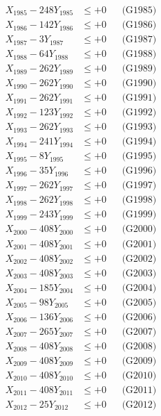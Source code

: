 \documentclass[a4paper,10pt]{article}
\begin{document}
{\begin{align}
X_{1985} - 248Y_{1985} &\leq +0 && \text{(G1985)} \\
X_{1986} - 142Y_{1986} &\leq +0 && \text{(G1986)} \\
X_{1987} - 3Y_{1987} &\leq +0 && \text{(G1987)} \\
X_{1988} - 64Y_{1988} &\leq +0 && \text{(G1988)} \\
X_{1989} - 262Y_{1989} &\leq +0 && \text{(G1989)} \\
X_{1990} - 262Y_{1990} &\leq +0 && \text{(G1990)} \\
\allowbreak
X_{1991} - 262Y_{1991} &\leq +0 && \text{(G1991)} \\
X_{1992} - 123Y_{1992} &\leq +0 && \text{(G1992)} \\
X_{1993} - 262Y_{1993} &\leq +0 && \text{(G1993)} \\
X_{1994} - 241Y_{1994} &\leq +0 && \text{(G1994)} \\
X_{1995} - 8Y_{1995} &\leq +0 && \text{(G1995)} \\
X_{1996} - 35Y_{1996} &\leq +0 && \text{(G1996)} \\
X_{1997} - 262Y_{1997} &\leq +0 && \text{(G1997)} \\
X_{1998} - 262Y_{1998} &\leq +0 && \text{(G1998)} \\
X_{1999} - 243Y_{1999} &\leq +0 && \text{(G1999)} \\
X_{2000} - 408Y_{2000} &\leq +0 && \text{(G2000)} \\
\allowbreak
X_{2001} - 408Y_{2001} &\leq +0 && \text{(G2001)} \\
X_{2002} - 408Y_{2002} &\leq +0 && \text{(G2002)} \\
X_{2003} - 408Y_{2003} &\leq +0 && \text{(G2003)} \\
X_{2004} - 185Y_{2004} &\leq +0 && \text{(G2004)} \\
X_{2005} - 98Y_{2005} &\leq +0 && \text{(G2005)} \\
X_{2006} - 136Y_{2006} &\leq +0 && \text{(G2006)} \\
X_{2007} - 265Y_{2007} &\leq +0 && \text{(G2007)} \\
X_{2008} - 408Y_{2008} &\leq +0 && \text{(G2008)} \\
X_{2009} - 408Y_{2009} &\leq +0 && \text{(G2009)} \\
X_{2010} - 408Y_{2010} &\leq +0 && \text{(G2010)} \\
\allowbreak
X_{2011} - 408Y_{2011} &\leq +0 && \text{(G2011)} \\
X_{2012} - 25Y_{2012} &\leq +0 && \text{(G2012)} \\

\end{align}}
\end{document}
